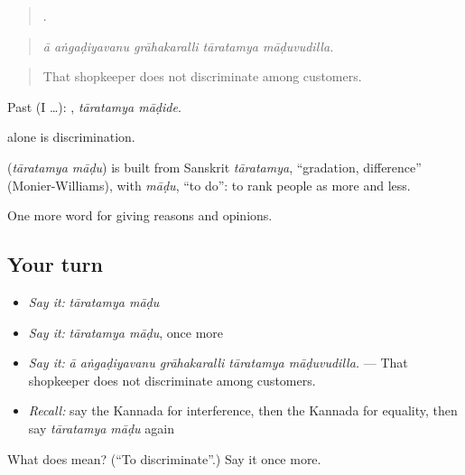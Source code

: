 \begin{quote}
    .
\end{quote}

\begin{quote}
\emph{ā aṅgaḍiyavanu grāhakaralli tāratamya māḍuvudilla.}
\end{quote}

\begin{quote}
That shopkeeper does not discriminate among customers.
\end{quote}

Past (I …):  , \emph{tāratamya māḍide}.

 alone is discrimination.

\begin{cousinweb}
\textbf{ } (\emph{tāratamya māḍu}) is built from Sanskrit \emph{tāratamya}, \textquotedblleft{}gradation, difference\textquotedblright{} (Monier-Williams), with \emph{māḍu}, \textquotedblleft{}to do\textquotedblright{}: to rank people as more and less.
\end{cousinweb}

\begin{grammarlens}[title={What you've built}]
One more word for giving reasons and opinions.
\end{grammarlens}

\subsection*{Your turn}
\begin{itemize}
\raggedright
  \item \emph{Say it:} \emph{tāratamya māḍu}
  \item \emph{Say it:} \emph{tāratamya māḍu}, once more
  \item \emph{Say it:} \emph{ā aṅgaḍiyavanu grāhakaralli tāratamya māḍuvudilla.} — That shopkeeper does not discriminate among customers.
  \item \emph{Recall:} say the Kannada for interference, then the Kannada for equality, then say \emph{tāratamya māḍu} again
\end{itemize}

\begin{tcolorbox}[breakable,colback=teal!4,colframe=teal!35!black,title={Before you move on}]
What does   mean? (\textquotedblleft{}To discriminate\textquotedblright{}.) Say it once more.
\end{tcolorbox}
